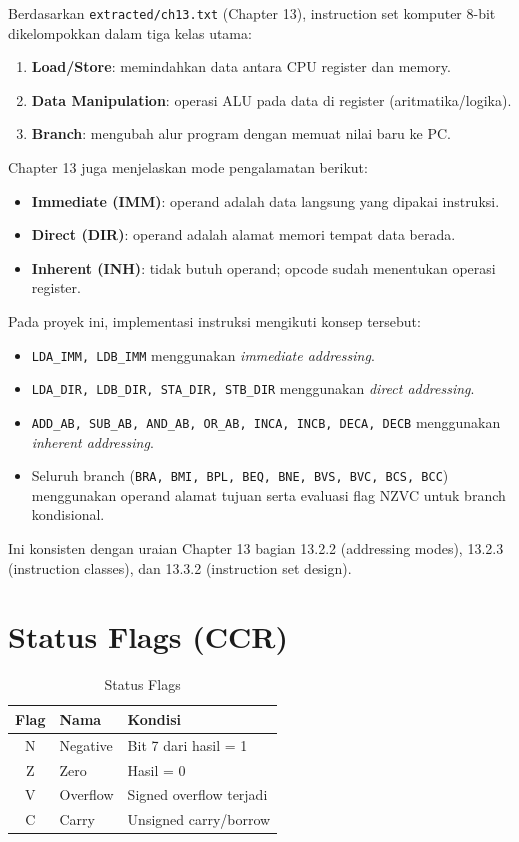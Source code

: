 \documentclass[12pt,a4paper]{report}
\begin{document}
Berdasarkan \texttt{extracted/ch13.txt} (Chapter 13), instruction set komputer 8-bit dikelompokkan dalam tiga kelas utama:
\begin{enumerate}
  \item \textbf{Load/Store}: memindahkan data antara CPU register dan memory.
  \item \textbf{Data Manipulation}: operasi ALU pada data di register (aritmatika/logika).
  \item \textbf{Branch}: mengubah alur program dengan memuat nilai baru ke PC.
\end{enumerate}

Chapter 13 juga menjelaskan mode pengalamatan berikut:
\begin{itemize}
  \item \textbf{Immediate (IMM)}: operand adalah data langsung yang dipakai instruksi.
  \item \textbf{Direct (DIR)}: operand adalah alamat memori tempat data berada.
  \item \textbf{Inherent (INH)}: tidak butuh operand; opcode sudah menentukan operasi register.
\end{itemize}

Pada proyek ini, implementasi instruksi mengikuti konsep tersebut:
\begin{itemize}
  \item \texttt{LDA\_IMM, LDB\_IMM} menggunakan \textit{immediate addressing}.
  \item \texttt{LDA\_DIR, LDB\_DIR, STA\_DIR, STB\_DIR} menggunakan \textit{direct addressing}.
  \item \texttt{ADD\_AB, SUB\_AB, AND\_AB, OR\_AB, INCA, INCB, DECA, DECB} menggunakan \textit{inherent addressing}.
  \item Seluruh branch (\texttt{BRA, BMI, BPL, BEQ, BNE, BVS, BVC, BCS, BCC}) menggunakan operand alamat tujuan serta evaluasi flag NZVC untuk branch kondisional.
\end{itemize}

Ini konsisten dengan uraian Chapter 13 bagian 13.2.2 (addressing modes), 13.2.3 (instruction classes), dan 13.3.2 (instruction set design).

\section{Status Flags (CCR)}

\begin{table}[H]
  \centering
  \begin{tabular}{|c|l|l|}
    \hline
    \textbf{Flag} & \textbf{Nama} & \textbf{Kondisi} \\
    \hline
    N & Negative & Bit 7 dari hasil = 1 \\
    Z & Zero & Hasil = 0 \\
    V & Overflow & Signed overflow terjadi \\
    C & Carry & Unsigned carry/borrow \\
    \hline
  \end{tabular}
  \caption{Status Flags}
\end{table}
\end{document}
